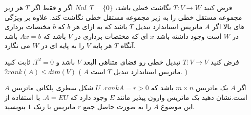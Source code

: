 \documentclass{article}
\begin{document}
\begin{enumerate}[label=\alph*)]
\begin{enumerate}
\end{enumerate}
فرض کنید 
$T:V\longrightarrow W$
نگاشت خطی باشد،
$Nul\ \ T=\{0\}$
اگر و فقط اگر 
$T$
هر زیر مجموعه مستقل خطی را به زیر مجموعه مستقل خطی نگاشت کند. علاوه بر ویژگی های بالا اگر 
$A$
ماتریس استاندارد تبدیل 
$T$
باشد که به ازای هر 
$b$
که 
$b$
مختصات برداری در 
$W$
است وجود داشته باشد 
$x$
ای که مختصات برداری در 
$V$
 باشد که
 $Ax=b$
 باشد آنگاه 
 $T$
 هر پایه
 $V$
  را به پایه ای در 
  $W$
   می نگارد.
   
    فرض کنید 
   $T:V\longrightarrow V$
   تبدیل خطی رو فضای متناهی البعد 
   $V$
   باشد و 
   $T^2=0$.
   ثابت کنید 
   \\
$2rank(A)\leq dim(V)$
   (
   $A$
   ماتریس استاندارد تبدیل 
   $T$
   است.
   )
   
   اگر 
   $A$
    یک ماتریس 
    $m\times n$
    باشد که 
    $rank A=r>0$.
 $U$
   شکل سطری پلکانی ماتریس 
   $A$
   است.نشان دهید یک ماتریس وارون پیذیر مانند 
   $E$
   وجود دارد که 
   $A=EU$.
   با استفاده از این موضوع 
   $A$
    را به صورت حاصل جمع 
    $r$
    ماتریس با رنک 
    $1$
    بنویسید. 


\end{enumerate}
\end{document}
